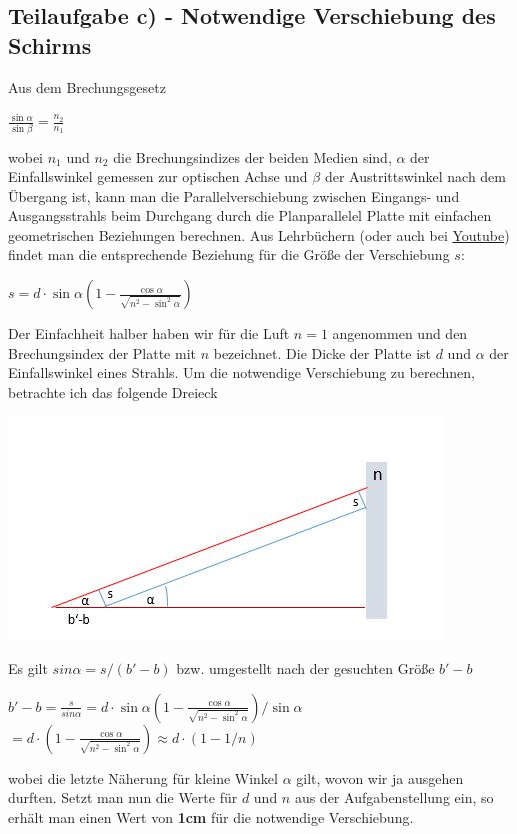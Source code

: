 \documentclass{article}
\begin{document}
\subsection*{Teilaufgabe c) - Notwendige Verschiebung des Schirms}
Aus dem Brechungsgesetz 
\begin{center}
	$\frac{\sin\alpha}{\sin\beta}=\frac{n_2}{n_1}$
\end{center}
wobei $n_1$ und $n_2$ die Brechungsindizes der beiden Medien sind, $\alpha$ der Einfallswinkel gemessen zur 
optischen Achse und $\beta$ der Austrittswinkel nach dem Übergang ist, 
kann man die Parallelverschiebung zwischen Eingangs- und Ausgangsstrahls beim Durchgang durch die Planparallelel Platte mit einfachen geometrischen Beziehungen berechnen.
Aus Lehrbüchern (oder auch bei \href{https://www.youtube.com/watch?v=j2ptt32nMWg}{Youtube}) findet man die entsprechende Beziehung für die Größe der Verschiebung $s$:
\begin{center}
	$s=d\cdot \sin\alpha \left( 1-\frac{\cos\alpha}{\sqrt{n^2-\sin^2\alpha}}\right)$
\end{center}
Der Einfachheit halber haben wir für die Luft $n=1$ angenommen und den Brechungsindex der 
Platte mit $n$ bezeichnet. Die Dicke der Platte ist $d$ und $\alpha$ der Einfallswinkel eines Strahls. 
Um die notwendige Verschiebung zu berechnen, betrachte ich das folgende Dreieck
\begin{center}
	\includegraphics[scale=0.6]{Linse2.JPG}
\end{center}
Es gilt $sin\alpha=s/(b'-b)$ bzw. umgestellt nach der gesuchten Größe $b'-b$
\begin{center}
	$b'-b = \frac{s}{sin\alpha} = d\cdot \sin\alpha \left( 1-\frac{\cos\alpha}{\sqrt{n^2-\sin^2\alpha}}\right) / \sin\alpha $ \\
	$= d \cdot  \left( 1-\frac{\cos\alpha}{\sqrt{n^2-\sin^2\alpha}}\right) \approx d\cdot (1-1/n)$
\end{center}
wobei die letzte Näherung für kleine Winkel $\alpha$ gilt, wovon wir ja ausgehen durften.
Setzt man nun die Werte für $d$ und $n$ aus der Aufgabenstellung ein, so erhält man einen Wert von \textbf{1cm} für die notwendige Verschiebung. 
\end{document}
